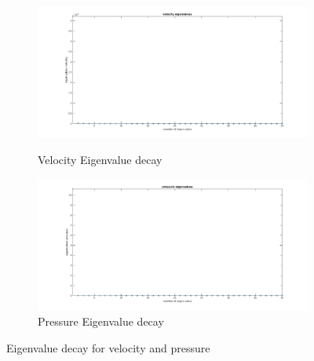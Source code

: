 \documentclass[a4paper,oneside,openright,spanish,english]{book}
\begin{document}
\begin{figure}
\begin{subfigure}{\textwidth}	
  \includegraphics[width=\linewidth]{velocity_eigen_value.jpg}
  \caption{Velocity Eigenvalue decay} 
  \label{eigen_value_decay_velocity}
  \includegraphics[width=\linewidth]{pressure_eigen_value.jpg}
  \caption{Pressure Eigenvalue decay} 
  \label{eigen_value_decay_pressure}
\end{subfigure}
\caption{Eigenvalue decay for velocity and pressure}
\label{pod_eigenvalue_figure}
\end{figure}
\end{document}
